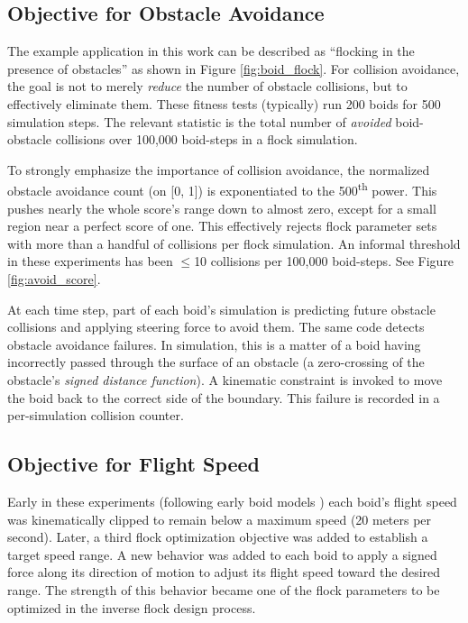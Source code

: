 \documentclass[letterpaper]{article}
\begin{document}
\subsection{Objective for Obstacle Avoidance}
\label{subsec:avoidance_objective}

The example application in this work can be described as ``flocking in the presence of obstacles'' as shown in Figure \ref{fig:boid_flock}. For collision avoidance, the goal is not to merely \textit{reduce} the number of obstacle collisions, but to effectively eliminate them. These fitness tests (typically) run 200 boids for 500 simulation steps. The relevant statistic is the total number of \textit{avoided} boid-obstacle collisions over 100,000 boid-steps in a flock simulation.

To strongly emphasize the importance of collision avoidance, the normalized obstacle avoidance count (on [0, 1]) is exponentiated to the 500\textsuperscript{th} power. This pushes nearly the whole score's range down to almost zero, except for a small region near a perfect score of one. This effectively rejects flock parameter sets with more than a handful of collisions per flock simulation. An informal threshold in these experiments has been {$\leq$}10 collisions per 100,000 boid-steps. See Figure \ref{fig:avoid_score}.

At each time step, part of each boid's simulation is predicting future obstacle collisions and applying steering force to avoid them. The same code detects obstacle avoidance failures. In simulation, this is a matter of a boid having incorrectly passed through the surface of an obstacle (a zero-crossing of the obstacle's \textit{signed distance function}). A kinematic constraint is invoked to move the boid back to the correct side of the boundary. This failure is recorded in a per-simulation collision counter.

\subsection{Objective for Flight Speed}
\label{subsec:speed_objective}

Early in these experiments (following early boid models \citep{reynolds_flocks_1987}) each boid's flight speed was kinematically clipped to remain below a maximum speed (20 meters per second). Later, a third flock optimization objective was added to establish a target speed range. A new behavior was added to each boid to apply a signed force along its direction of motion to adjust its flight speed toward the desired range. The strength of this behavior became one of the flock parameters to be optimized in the inverse flock design process.
\end{document}
